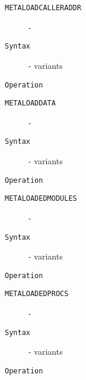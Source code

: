 \clearpage
\begin{description}
\item[\texttt{METALOADCALLERADDR}]  - \\
\item[\texttt{Syntax}] - variants\\

\item[\texttt{Operation}]
\item[\texttt{}]
\end{description}
\clearpage
\begin{description}
\item[\texttt{METALOADDATA}]  - \\
\item[\texttt{Syntax}] - variants\\

\item[\texttt{Operation}]
\item[\texttt{}]
\end{description}
\clearpage
\begin{description}
\item[\texttt{METALOADEDMODULES}]  - \\
\item[\texttt{Syntax}] - variants\\

\item[\texttt{Operation}]
\item[\texttt{}]
\end{description}
\clearpage
\begin{description}
\item[\texttt{METALOADEDPROCS}]  - \\
\item[\texttt{Syntax}] - variants\\

\item[\texttt{Operation}]
\item[\texttt{}]
\end{description}
